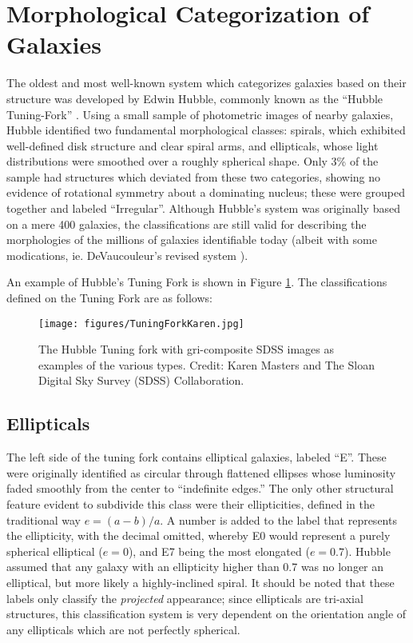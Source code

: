 \section{Morphological Categorization of Galaxies}

The oldest and most well-known system which categorizes galaxies based on their structure was developed by Edwin Hubble, commonly known as the ``Hubble Tuning-Fork'' \citep{Hubble1926}. Using a small sample of photometric images of nearby galaxies, Hubble identified two fundamental morphological classes: spirals, which exhibited well-defined disk structure and clear spiral arms, and ellipticals, whose light distributions were smoothed over a roughly spherical shape. Only 3\% of the sample had structures which deviated from these two categories, showing no evidence of rotational symmetry about a dominating nucleus; these were grouped together and labeled ``Irregular''. Although Hubble's system was originally based on a mere 400 galaxies, the classifications are still valid for describing the morphologies of the millions of galaxies identifiable today (albeit with some modications, ie. DeVaucouleur's revised system \citep{DeVaucouleurs1963}).

An example of Hubble's Tuning Fork is shown in Figure \ref{fig:tuningfork}. The classifications defined on the Tuning Fork are as follows:

\begin{figure}
\centering
\texttt{[image: figures/TuningForkKaren.jpg]}
\label{fig:tuningfork}
\caption{The Hubble Tuning fork with gri-composite SDSS images as examples of the various types. Credit: Karen Masters and The Sloan Digital Sky Survey (SDSS) Collaboration.}
\end{figure}

\subsection{Ellipticals}

The left side of the tuning fork contains elliptical galaxies, labeled ``E''. These were originally identified as circular through flattened ellipses whose luminosity faded smoothly from the center to ``indefinite edges.'' The only other structural feature evident to subdivide this class were their ellipticities, defined in the traditional way $e=(a-b)/a$. A number is added to the label that represents the ellipticity, with the decimal omitted, whereby E0 would represent a purely spherical elliptical ($e=0$), and E7 being the most elongated ($e=0.7$). Hubble assumed that any galaxy with an ellipticity higher than 0.7 was no longer an elliptical, but more likely a highly-inclined spiral. It should be noted that these labels only classify the \emph{projected} appearance; since ellipticals are tri-axial structures, this classification system is very dependent on the orientation angle of any ellipticals which are not perfectly spherical.  

